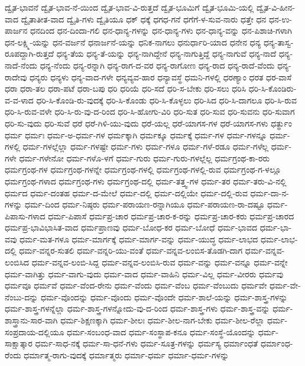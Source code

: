 {ದ್ವೈತ-ಭಾವನೆ
ದ್ವೈತ-ಭಾವ-ನೆ-ಯಿಂದ
ದ್ವೈತ-ಭಾವ-ವಿ-ರುತ್ತದೆ
ದ್ವೈತ-ಭೂಮಿಗೆ
ದ್ವೈತ-ಭೂಮಿ-ಯಲ್ಲಿ
ದ್ವೈತ-ವಿ-ಹೀನ-ವಾದ
ದ್ವೈತಾತೀತ-ವಾದ
ದ್ವೈತಿ-ಗಳು
ದ್ವೈತಿಯೂ
ಧಕ್
ಧಕ್ಕೆ
ಧಗಧ-ಗನೆ
ಧಗೆಗೆ-ಳ-ಸುವ-ನಾರು
ಧತ್ತೇ
ಧನ
ಧನ-ಉ-ಪಾರ್ಜನ
ಧನದಿಂದ
ಧನ-ದಿಂದಾ-ಗಲಿ
ಧನ-ಧಾನ್ಯ-ಗಳನ್ನು
ಧನ-ಧಾನ್ಯ-ಗಳು
ಧನ-ಧಾನ್ಯ-ವನ್ನು
ಧನ-ಪಿಶಾಚಿ-ಗಳಾಗಿ
ಧನ-ಲಕ್ಷ್ಮಿ-ಯನ್ನು
ಧನ-ವರ್ಜನೆ
ಧನಾರ್ಜನೆ-ಯನ್ನು
ಧನಿಕ-ನಾಗಲು
ಧನುರ್ಧಾರಿ-ಯಾದ
ಧನೇನ
ಧನ್ಯ
ಧನ್ಯ-ತಾಸ್ವ-ರೂಪದ್ದಾಗಿ-ರುತ್ತದೆ
ಧನ್ಯ-ತೆಯ
ಧನ್ಯ-ತೆ-ಯನ್ನು
ಧನ್ಯ-ನಾಗಿದ್ದೇನೆ
ಧನ್ಯ-ನಾಗುತ್ತಿದ್ದೆ
ಧನ್ಯ-ನಾಗುವೆ
ಧನ್ಯ-ನಾದೆ
ಧನ್ಯ-ನಾದೆ-ನೆಂದು
ಧನ್ಯ-ನೆಂದು
ಧನ್ಯ-ರನ್ನಾಗಿ
ಧನ್ಯ-ರಾಗ-ದ-ವರ
ಧನ್ಯ-ರಾಗೋಣ
ಧನ್ಯ-ರಾದ
ಧನ್ಯ-ರಾದೆ-ವೆಂದು
ಧನ್ಯ-ರಾದೇವು
ಧನ್ಯರು
ಧನ್ಯಳು
ಧನ್ಯ-ವಾದ-ಗಳೇ
ಧನ್ಯವ್ಯವ-ಹಾರ
ಧನ್ಯಾವಸ್ಥೆ
ಧಮನಿ-ಗಳಲ್ಲಿ
ಧರಣ್ಯಾಂ
ಧರತ
ಧರ-ವಾಸೆ
ಧರಾ
ಧರಾ-ತಲ
ಧರಾ-ಪಟೆ
ಧರಾ-ಬಪು
ಧರಿ
ಧರಿಯೆ
ಧರಿ-ಸದೆ
ಧರಿ-ಸ-ಬೇಕು
ಧರಿ-ಸಲು
ಧರಿಸಿ
ಧರಿ-ಸಿ-ಕೊಂಡಿರು-ವ-ವ-ಳಾದ
ಧರಿ-ಸಿ-ಕೊಂಡಿ-ರು-ವುದಕ್ಕೆ
ಧರಿ-ಸಿ-ಕೊಂಡು
ಧರಿ-ಸಿ-ಕೊಳ್ಳಲು
ಧರಿ-ಸಿದ
ಧರಿ-ಸಿ-ದಾಗಲೂ
ಧರಿ-ಸಿ-ರುವ
ಧರಿ-ಸಿ-ರುವ-ವಳೇ
ಧರಿ-ಸಿ-ರು-ವು-ದ-ರಿಂದ
ಧರಿ-ಸಿ-ಹೋಗು-ವಿರಿ
ಧರಿ-ಸುತ
ಧರಿ-ಸುವ
ಧರಿ-ಸುವನು
ಧರಿ-ಸುವಾಗ
ಧರಿ-ಸು-ವುದು
ಧರಿ-ಸುವೆ
ಧರೆ
ಧರೆ-ಗಿಳಿ-ಯು-ವುದು
ಧರೆ-ಯಲ್ಲ
ಧರೆ-ಯಾಗಸ-ಗಳ
ಧರೆ-ಯಾಗಸ-ಗಳು
ಧರ್ತ್ಥುಂ
ಧರ್ಮ
ಧರ್ಮಃ
ಧರ್ಮ-ಅ-ಧರ್ಮ-ಗಳ
ಧರ್ಮಕ್ಕಾಗಿ
ಧರ್ಮಕ್ಕೂ
ಧರ್ಮಕ್ಕೆ
ಧರ್ಮ-ಗಳ
ಧರ್ಮ-ಗಳನ್ನೂ
ಧರ್ಮ-ಗಳಲ್ಲಿ
ಧರ್ಮ-ಗಳಲ್ಲೆಲ್ಲಾ
ಧರ್ಮ-ಗಳಷ್ಟೇ
ಧರ್ಮ-ಗಳು
ಧರ್ಮ-ಗಳೂ
ಧರ್ಮ-ಗಳೆ-ರಡೂ
ಧರ್ಮ-ಗಳೆಲ್ಲ
ಧರ್ಮ-ಗಳೇ
ಧರ್ಮ-ಗಳೇನೋ
ಧರ್ಮ-ಗಳೊ-ಳಗೆ
ಧರ್ಮ-ಗುರು
ಧರ್ಮ-ಗುರು-ಗಳಲ್ಲೆಲ್ಲ
ಧರ್ಮಗ್ರಂಥ-ಕಾ-ರರು
ಧರ್ಮಗ್ರಂಥ-ಗಳ
ಧರ್ಮಗ್ರಂಥ-ಗಳನ್ನೇ
ಧರ್ಮಗ್ರಂಥ-ಗಳಲ್ಲಿ
ಧರ್ಮಗ್ರಂಥ-ಗಳಲ್ಲಿ-ರುವ
ಧರ್ಮಗ್ರಂಥ-ಗ-ಳಲ್ಲೂ
ಧರ್ಮಗ್ರಂಥ-ಗಳಾದ
ಧರ್ಮಗ್ರಂಥ-ಗಳು
ಧರ್ಮಗ್ರಂಥ-ದಲ್ಲಿ
ಧರ್ಮ-ತತ್ತ್ವ-ಗಳ
ಧರ್ಮ-ತರ
ಧರ್ಮ-ತರು-ವಿ-ನಲ್ಲಿ
ಧರ್ಮದ
ಧರ್ಮ-ದಂತಹ
ಧರ್ಮ-ದ-ಮೇಲೆ
ಧರ್ಮ-ದಲ್ಲಿ
ಧರ್ಮ-ದಲ್ಲಿಯೇ
ಧರ್ಮ-ದಲ್ಲಿ-ರುವ
ಧರ್ಮ-ದಾ-ನ-ಗಳನ್ನು
ಧರ್ಮ-ದಿಂದ
ಧರ್ಮ-ನಿಷ್ಠರು
ಧರ್ಮ-ಪರಾಯಣ-ರನ್ನಾಗಿಯೂ
ಧರ್ಮ-ಪರಾಯಣ-ರಾ-ದಷ್ಟೂ
ಧರ್ಮ-ಪಿಪಾಸು-ಗಳಾದ
ಧರ್ಮ-ಪಿಪಾಸೆ
ಧರ್ಮಪ್ರ-ಚಾರ
ಧರ್ಮಪ್ರ-ಚಾರ-ಕ-ರನ್ನು
ಧರ್ಮಪ್ರ-ಚಾರ-ಕರು
ಧರ್ಮಪ್ರ-ಚಾರದ
ಧರ್ಮಪ್ರ-ಭಾವಿಭಾಸಿತ-ವಾದ
ಧರ್ಮಪ್ರಾಣವು
ಧರ್ಮ-ಬೋಧ-ಕರ
ಧರ್ಮ-ಬೋಧೆ
ಧರ್ಮ-ಭಾವದ
ಧರ್ಮ-ಭಾ-ವವು
ಧರ್ಮ-ಮತ-ಗಳೂ
ಧರ್ಮ-ಮಾರ್ಗಕ್ಕೆ
ಧರ್ಮ-ಮಾರ್ಗ-ವನ್ನು
ಧರ್ಮ-ಯುದ್ಧ
ಧರ್ಮ-ಲಾಭದ
ಧರ್ಮ-ಲಾಭ-ದಲ್ಲಿ
ಧರ್ಮ-ವನ್ನರ-ಸುತಲಿ
ಧರ್ಮ-ವನ್ನರಿ-ಯು-ವಂತೆ
ಧರ್ಮ-ವನ್ನವ-ಲಂಬಿಸ-ತೊಡಗಿ-ದಾಗ
ಧರ್ಮ-ವನ್ನವ-ಲಂಬಿಸಿದ
ಧರ್ಮ-ವನ್ನವ-ಲಂಬಿ-ಸಿದ್ದ
ಧರ್ಮ-ವನ್ನವ-ಲಂಬಿಸಿ-ರುವ
ಧರ್ಮ-ವನ್ನು
ಧರ್ಮ-ವನ್ನೂ
ಧರ್ಮ-ವನ್ನೇ
ಧರ್ಮ-ವಾಗಿತ್ತು
ಧರ್ಮ-ವಾಗು-ವುದು
ಧರ್ಮ-ವಾದ
ಧರ್ಮ-ವಾಹಿನಿ
ಧರ್ಮ-ವಿಲ್ಲ
ಧರ್ಮ-ವೀರರು
ಧರ್ಮವು
ಧರ್ಮವೂ
ಧರ್ಮವೆ
ಧರ್ಮ-ವೆಂದ-ರೇನು
ಧರ್ಮ-ವೆಂದು
ಧರ್ಮ-ವೆಂಬ
ಧರ್ಮ-ವೆಂಬುದು
ಧರ್ಮವೇ
ಧರ್ಮ-ವೇ-ನೆಂಬು-ದನ್ನು
ಧರ್ಮ-ವೊಂದನ್ನು
ಧರ್ಮ-ವೊಂದು
ಧರ್ಮ-ವೊಂದೇ
ಧರ್ಮ-ಶಾಲೆ-ಯನ್ನು
ಧರ್ಮ-ಶಾಸ್ತ್ರ-ಗಳನ್ನು
ಧರ್ಮ-ಶಾಸ್ತ್ರ-ಗಳನ್ನೆಲ್ಲಾ
ಧರ್ಮ-ಶಾಸ್ತ್ರ-ಗಳನ್ನೋದು-ವು-ದ-ರಿಂದ
ಧರ್ಮ-ಶಾಸ್ತ್ರ-ಗಳು
ಧರ್ಮ-ಶಾಸ್ತ್ರ-ವನ್ನು
ಧರ್ಮ-ಶಾಸ್ತ್ರಾನು-ಸಾರ-ವಾಗಿ
ಧರ್ಮ-ಶಿಕ್ಷಣಕ್ಕಾಗಿ
ಧರ್ಮ-ಶೀಲಃ
ಧರ್ಮ-ಶೀಲ-ನಾಗ-ಬೇಕು
ಧರ್ಮ-ಶೀಲ-ರೆಲ್ಲಾ
ಧರ್ಮ-ಸಂಪ್ರದಾಯ-ದಲ್ಲಿಯೂ
ಧರ್ಮ-ಸಂಬಂಧ-ವಾದ
ಧರ್ಮ-ಸಂಸ್ಥಾಪ-ಕನೂ
ಧರ್ಮ-ಸಂಸ್ಥೆ-ಯೊಂದನ್ನು
ಧರ್ಮ-ಸಾಕ್ಷಾತ್ಕಾರ
ಧರ್ಮ-ಸಾಧ-ನಕ್ಕೆ
ಧರ್ಮ-ಸಾ-ಧನೆ-ಗಳು
ಧರ್ಮ-ಸೂತ್ರ-ಗಳನ್ನು
ಧರ್ಮಸ್ಯ
ಧರ್ಮಾಂಧತೆ
ಧರ್ಮಾಂಧ-ರೆಂದು
ಧರ್ಮಾತ್ಮ-ರಾಗು-ವುದಕ್ಕೆ
ಧರ್ಮಾತ್ಮರು
ಧರ್ಮಾ-ಧರ್ಮ
ಧರ್ಮಾ-ಧರ್ಮ-ಗಳನ್ನು
}
